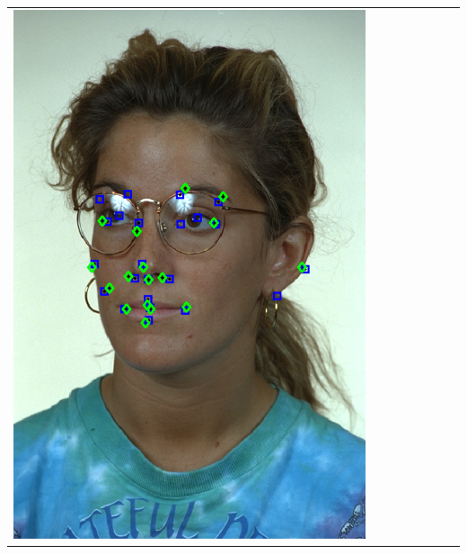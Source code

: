 \documentclass[portrait,final,a0paper,fontscale=0.277]{baposter}
\begin{document}
\begin{poster}
{{\begin{tabular}{@{}rccccccc@{}}
\parbox[c]{0.11\linewidth}{\includegraphics[width=\linewidth]{images/l_ql_success_2.pdf}} &

\end{tabular}}}
\end{poster}
\end{document}
